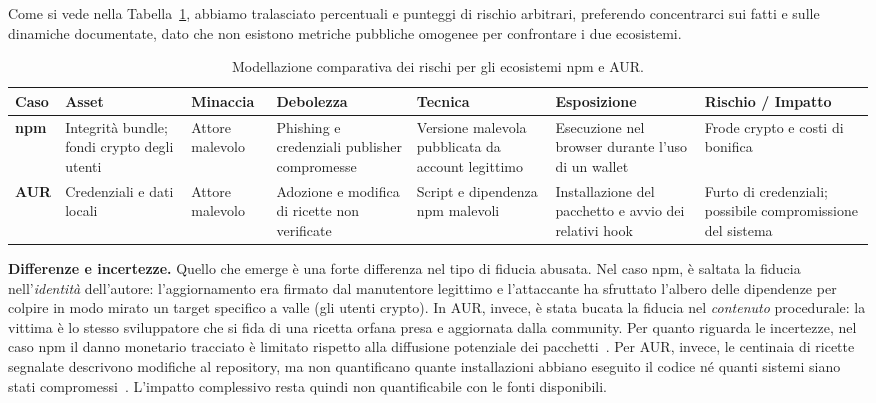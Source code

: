 Come si vede nella Tabella~\ref{tab:rischi_comparati}, abbiamo tralasciato percentuali e punteggi di rischio arbitrari, preferendo concentrarci sui fatti e sulle dinamiche documentate, dato che non esistono metriche pubbliche omogenee per confrontare i due ecosistemi.

\begin{table}[htbp]
\centering
\footnotesize
\renewcommand{\arraystretch}{1.2}
\begin{tabular}{|p{1.4cm}|p{2cm}|p{1.6cm}|p{2cm}|p{2.3cm}|p{2.1cm}|p{2cm}|}
\hline
\textbf{Caso} & \textbf{Asset} & \textbf{Minaccia} & \textbf{Debolezza} & \textbf{Tecnica} & \textbf{Esposizione} & \textbf{Rischio / Impatto} \\ \hline
\textbf{npm} & Integrità bundle; fondi crypto degli utenti & Attore malevolo & Phishing e credenziali publisher compromesse & Versione malevola pubblicata da account legittimo & Esecuzione nel browser durante l'uso di un wallet & Frode crypto e costi di bonifica \\ \hline
\textbf{AUR} & Credenziali e dati locali & Attore malevolo & Adozione e modifica di ricette non verificate & Script e dipendenza npm malevoli & Installazione del pacchetto e avvio dei relativi hook & Furto di credenziali; possibile compromissione del sistema \\ \hline
\end{tabular}
\caption{Modellazione comparativa dei rischi per gli ecosistemi npm e AUR.}
\label{tab:rischi_comparati}
\end{table}

\textbf{Differenze e incertezze.} Quello che emerge è una forte differenza nel tipo di fiducia abusata. Nel caso npm, è saltata la fiducia nell'\emph{identità} dell'autore: l'aggiornamento era firmato dal manutentore legittimo e l'attaccante ha sfruttato l'albero delle dipendenze per colpire in modo mirato un target specifico a valle (gli utenti crypto). In AUR, invece, è stata bucata la fiducia nel \emph{contenuto} procedurale: la vittima è lo stesso sviluppatore che si fida di una ricetta orfana presa e aggiornata dalla community. 
Per quanto riguarda le incertezze, nel caso npm il danno monetario tracciato è limitato rispetto alla diffusione potenziale dei pacchetti~\cite{debug2025,cso2025}. Per AUR, invece, le centinaia di ricette segnalate descrivono modifiche al repository, ma non quantificano quante installazioni abbiano eseguito il codice né quanti sistemi siano stati compromessi~\cite{arch-aur-incident-2026,ioctl2026}. L'impatto complessivo resta quindi non quantificabile con le fonti disponibili.
